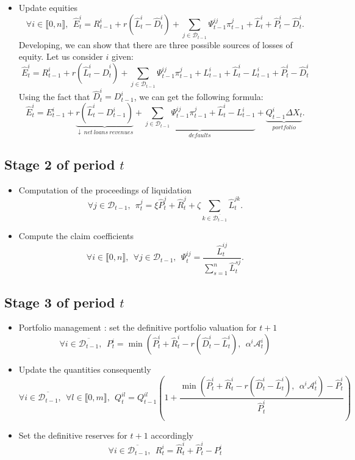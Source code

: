 \documentclass{article}
\newcommand{\wh}{\widehat}
\begin{document}
\begin{itemize}
    \item Update equities
    $$\forall i \in \llbracket 0, n \rrbracket,~~ \wh E^i_t = R_{t-1}^i + r (\wh L_t^i - \wh D_t^i) + \sum_{j \in \mathcal{D}_{t-1}} \Psi_{t-1}^{ij} \pi_{t-1}^j + \wh L^i_t + \wh P_t^i - \wh D^i_t.$$
    Developing, we can show that there are three possible sources of losses of equity. Let us consider $i$ given: 
    $$\wh E^i_t = R_{t-1}^i + r (\wh L_t^i - \wh D_t^i) + \sum_{j \in \mathcal{D}_{t-1}} \Psi_{t-1}^{ij} \pi_{t-1}^j + L_{t-1}^i + \wh L_t^i - L_{t-1}^i + \wh P_t^i - \wh D^i_t$$
    Using the fact that $\wh D_t^i = D_{t-1}^i$, we can get the following formula: 
    $$\wh E^i_t = E^i_{t-1} + \underbrace{r (\wh L_t^i - D_{t-1}^i)}_{\downarrow~net~loans~revenues} + \underbrace{\sum_{j \in \mathcal{D}_{t-1}} \Psi_{t-1}^{ij} \pi_{t-1}^j + \wh L_t^i - L_{t-1}^i}_{defaults} + \underbrace{Q_{t-1}^i\Delta X_t}_{portfolio}.$$
\end{itemize}


\subsection{Stage 2 of period $t$}
\begin{itemize}
    
    \item Computation of the proceedings of liquidation
    $$ \forall j \in \mathcal{D}_{t-1},~~ \pi_t^j = \xi \widehat{P}_t^j + \widehat{R}_t^j + \zeta \sum_{k \in \overline{\mathcal{D}_{t-1}}} \wh L^{jk}_t.$$ 
        
    \item Compute the claim coefficients
    $$\forall i \in \llbracket 0, n \rrbracket,~~\forall j \in \mathcal{D}_{t-1},~~\Psi_t^{ij} = \frac{ \wh L_t^{ij}}{\sum_{s=1}^n \wh L_t^{sj}}.$$
\end{itemize}


\subsection{Stage 3 of period $t$}

\begin{itemize}

\item Portfolio management : set the definitive portfolio valuation for $t+1$
$$\forall i \in \overline{\mathcal{D}_{t-1}},~~P_t^{i} = \min(\widehat{P}_t^i + \widehat{R}_t^i - r( \wh D_t^i - \wh L_t^i),~~\alpha^i \mathcal{A}_t^i)$$

\item Update the quantities consequently
$$\forall i \in \overline{\mathcal{D}_{t-1}},~~\forall l \in \llbracket 0, m \rrbracket,~~Q_t^{il} = Q_{t-1}^{il}\left(1 + \frac{\min(\widehat{P}_t^i + \widehat{R}_t^i - r( \wh D_t^i - \wh L_t^i),~~\alpha^i \mathcal{A}_t^i) - \widehat{P}_t^i}{\widehat{P}_t^i} \right)$$

\item Set the definitive reserves for $t+1$ accordingly
$$\forall i \in \overline{\mathcal{D}_{t-1}},~~R_t^i = \widehat{R}_t^i + \widehat{P}_t^i - P_t^i$$
\end{itemize}
\end{document}
